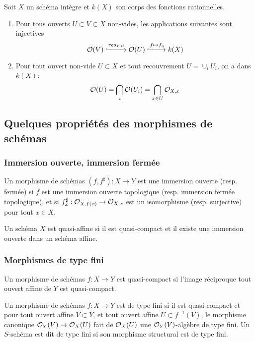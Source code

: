 \begin{prop}
Soit $X$ un schéma intègre et $k(X)$ son corps des fonctions rationnelles. 
\begin{enumerate}
\item Pour tous ouverts $U\subset V\subset X$ non-vides, les applications suivantes sont injectives
$$\mathcal{O}(V)\xhookrightarrow{res_{V,U}}\mathcal{O}(U)\xhookrightarrow{f\mapsto f_\eta} k(X)$$
\item Pour tout ouvert non-vide $U\subset X$ et tout recouvrement $U=\cup_i U_i$, on a dans $k(X)$:
$$\mathcal{O}(U)=\bigcap_i \mathcal{O}(U_i)=\bigcap_{x\in U}\mathcal{O}_{X,x}$$
\end{enumerate}
\end{prop}

\subsection{Quelques propriétés des morphismes de schémas}



\subsubsection{Immersion ouverte, immersion fermée}

\begin{defn}
Un morphisme de schémas $(f,f^\sharp):X\rightarrow Y$ est une immersion ouverte (resp. fermée) si $f$ est une immersion ouverte topologique (resp. immersion fermée topologique), et si $f^\sharp_x:\mathcal{O}_{X,f(x)}\rightarrow \mathcal{O}_{X,x}$ est un isomorphisme (resp. surjective) pour tout $x\in X$.
\end{defn}

\begin{defn}
Un schéma $X$ est quasi-affine si il est quasi-compact et il existe une immersion ouverte dans un schéma affine.
\end{defn}

\subsubsection{Morphismes de type fini}

\begin{defn}
Un morphisme de schémas $f:X\rightarrow Y$ est quasi-compact si l'image réciproque tout ouvert affine de $Y$ est quasi-compact. 
\end{defn}

\begin{defn}
Un morphisme de schémas $f:X\rightarrow Y$ est de type fini si il est quasi-compact et pour tout ouvert affine $V\subset Y$, et tout ouvert affine $U\subset f^{-1}(V)$, le morphisme canonique $\mathcal{O}_Y(V)\rightarrow \mathcal{O}_X(U)$ fait de $\mathcal{O}_X(U)$ une $\mathcal{O}_Y(V)$-algèbre de type fini. Un $S$-schéma est dit de type fini si son morphisme structural est de type fini.
\end{defn}

